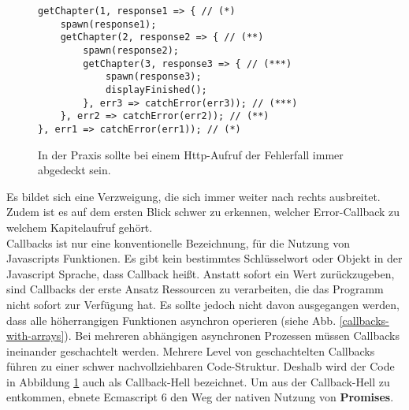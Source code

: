\begin{figure}[H]
\begin{lstlisting}[basicstyle=\small]
getChapter(1, response1 => { // (*)
    spawn(response1);
    getChapter(2, response2 => { // (**)
        spawn(response2);
        getChapter(3, response3 => { // (***)
            spawn(response3);
            displayFinished();
        }, err3 => catchError(err3)); // (***)
    }, err2 => catchError(err2)); // (**)
}, err1 => catchError(err1)); // (*)
\end{lstlisting}
\caption{In der Praxis sollte bei einem Http-Aufruf der Fehlerfall immer abgedeckt sein.}
\label{Nested-Callback-with-catch-error}
\end{figure}

\noindent
Es bildet sich eine Verzweigung, die sich immer weiter nach rechts ausbreitet. Zudem ist es auf dem ersten Blick schwer zu erkennen, welcher Error-Callback zu welchem Kapitelaufruf gehört.\\

\noindent
Callbacks ist nur eine konventionelle Bezeichnung, für die Nutzung von Javascripts Funktionen. Es gibt kein bestimmtes Schlüsselwort oder Objekt in der Javascript Sprache, dass Callback heißt. Anstatt sofort ein Wert zurückzugeben, sind Callbacks der erste Ansatz Ressourcen zu verarbeiten, die das Programm nicht sofort zur Verfügung hat. Es sollte jedoch nicht davon ausgegangen werden, dass alle höherrangigen Funktionen asynchron operieren (siehe Abb. \ref{callbacks-with-arrays}). Bei mehreren abhängigen asynchronen Prozessen müssen Callbacks ineinander geschachtelt werden. Mehrere Level von geschachtelten Callbacks führen zu einer schwer nachvollziehbaren Code-Struktur. Deshalb wird der Code in Abbildung \ref{Nested-Callback-with-catch-error} auch als \glqq{}Callback-Hell\grqq{} bezeichnet. Um aus der Callback-Hell zu entkommen, ebnete Ecmascript 6 den Weg der nativen Nutzung von \textbf{Promises}.



